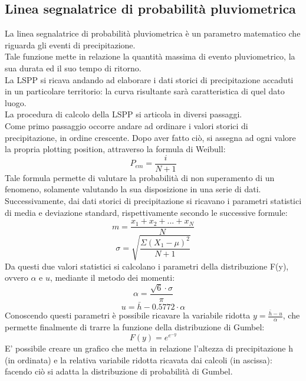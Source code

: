 \subsection{Linea segnalatrice di probabilità pluviometrica}
La linea segnalatrice di probabilità pluviometrica è un parametro matematico che riguarda gli eventi di precipitazione.\\
Tale funzione mette in relazione la quantità massima di evento pluviometrico, la sua durata ed il suo tempo di ritorno. \\
La LSPP si ricava andando ad elaborare i dati storici di precipitazione accaduti in un particolare territorio: la curva risultante sarà caratteristica di quel dato luogo.\\
La procedura di calcolo della LSPP si articola in diversi passaggi. \\
Come primo passaggio occorre andare ad ordinare i valori storici di precipitazione, in ordine crescente. Dopo aver fatto ciò, si assegna ad ogni valore la propria plotting position, attraverso la formula di Weibull:
\begin{equation}
\label{P_em}
    P_{em}=\frac{i}{N+1}
\end{equation}
Tale formula permette di valutare la probabilità di non superamento di un fenomeno, solamente valutando la sua disposizione in una serie di dati.\\
Successivamente, dai dati storici di precipitazione si ricavano i parametri statistici di media e deviazione standard, rispettivamente secondo le successive formule:
\begin{equation}
\label{media_aritmetica}
    m = \frac{x_1+x_2+...+x_N}{N}
\end{equation}
\begin{equation}
\label{dev.st}
    \sigma = \sqrt{\frac{\Sigma(X_1 - \mu)^2}{N+1}}
\end{equation}
Da questi due valori statistici si calcolano i parametri della distribuzione F(y), ovvero $\alpha$ e $u$, mediante il metodo dei momenti:
\begin{equation}
\label{alpha}
\alpha = \frac{\sqrt{6} \cdot \sigma}{\pi}    
\end{equation}
\begin{equation}
\label{u}
    u = \bar{h} - 0.5772 \cdot \alpha
\end{equation}
Conoscendo questi parametri è possibile ricavare la variabile ridotta $y = \frac{\bar{h}-u}{\alpha}$, che permette finalmente di trarre la funzione della distribuzione di Gumbel:
\begin{equation}
  F(y) = e^{e^{-y}}
\end{equation}
E' possibile creare un grafico che metta in relazione l'altezza di precipitazione h (in ordinata) e la relativa variabile ridotta ricavata dai calcoli (in ascissa): facendo ciò si adatta la distribuzione di probabilità di Gumbel.

